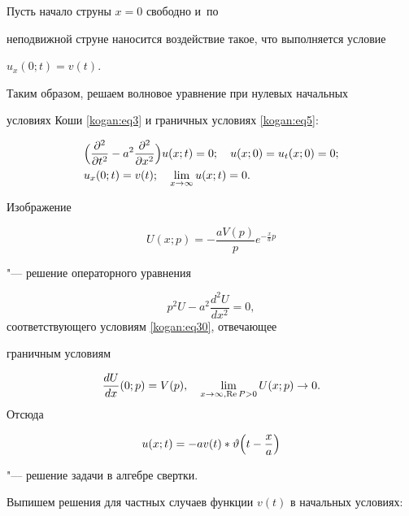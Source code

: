 Пусть начало струны $x=0$ свободно и~по 

неподвижной струне наносится воздействие такое, что выполняется условие 

$u_x  (0;t)=v(t)$. 

Таким образом, решаем волновое уравнение при нулевых начальных 

условиях Коши \eqref{kogan:eq3} и граничных условиях \eqref{kogan:eq5}: 

\begin{equation}

\label{kogan:eq30}

\begin{aligned}

& \Bigl( \frac{\partial ^2}{\partial t^2}-a^2\frac{\partial ^2}{\partial 

x^2} \Bigr)u(x;t)=0;

\quad

u(x;0)=u_t (x;0)=0;\\

& u_x (0;t)=v(t);

\quad

\lim _{x\to \infty } u(x;t)=0.

\end{aligned}

\end{equation}

Изображение 

$$U(x;p)=-\frac{aV(p)}{p}e^{-\frac{x}{a}p}$$

"--- решение операторного уравнения 

$$

p^2U-a^2\frac{d^2U}{dx^2}=0,$$  соответствующего условиям  \eqref{kogan:eq30},  отвечающее

граничным условиям 

$$\frac{dU}{dx}(0;p)=V(p), \quad \lim \limits_{x\to \infty, \mathop{\rm Re}P>0} U(x;p)\to 0.

$$ Отсюда 

\begin{equation}

\label{kogan:eq31}

u(x;t)=-av(t)\ast \vartheta \Bigl( t-\frac{x}{a}\Bigr)

\end{equation}

"--- решение задачи в алгебре свертки.



Выпишем решения для частных случаев функции $v(t)$ в начальных условиях:



